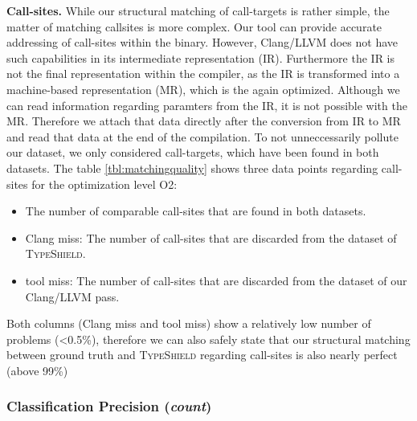 \textbf{Call-sites.} While our structural matching of call-targets is rather simple, the matter of matching callsites is more complex. Our tool can provide accurate addressing of call-sites within the binary. However, Clang/LLVM does not have such capabilities in its intermediate representation (IR). Furthermore the IR is not the final representation within the compiler, as the IR is transformed into a machine-based representation (MR), which is the again optimized. Although we can read information regarding paramters from the IR, it is not possible with the MR. Therefore we attach that data directly after the conversion from IR to MR and read that data at the end of the compilation. To not unneccessarily pollute our dataset, we only considered call-targets, which have been found in both datasets. 
The table \ref{tbl:matchingquality} shows three data points regarding call-sites for the optimization level O2:
\begin{itemize}
\item The number of comparable call-sites that are found in both datasets.
\item Clang miss: The number of call-sites that are discarded from the dataset of \textsc{TypeShield}.
\item tool miss: The number of call-sites that are discarded from the dataset of our Clang/LLVM pass.
\end{itemize}

Both columns (Clang miss and tool miss) show a relatively low number of problems (<0.5\%), therefore we can also safely state that our structural matching between ground truth and \textsc{TypeShield} regarding call-sites is also nearly perfect (above 99\%)

\subsubsection{Classification Precision (\textit{count})}
\label{subsection:typeshieldcountprecision}

